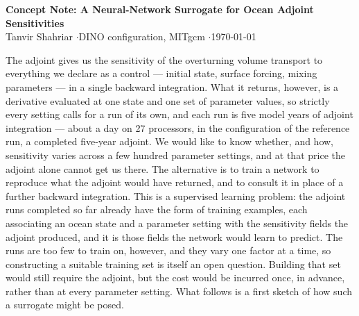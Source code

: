\begin{center}
{\large\bfseries Concept Note: A Neural-Network Surrogate for Ocean Adjoint Sensitivities}\\[2pt]
{\small Tanvir Shahriar \quad$\cdot$\quad DINO configuration, MITgcm
 \quad$\cdot$\quad \today}
\end{center}

The adjoint gives us the sensitivity of the overturning volume transport to everything we
declare as a control --- initial state, surface forcing, mixing parameters --- in a single
backward integration. What it returns, however, is a derivative evaluated at one state and
one set of parameter values, so strictly every setting calls for a run of its own, and each
run is five model years of adjoint integration --- about a day on 27 processors, in the
configuration of the reference run, a completed five-year adjoint. We would like to know
whether, and how, sensitivity varies across a few hundred parameter settings, and at that
price the adjoint alone cannot get us there. The alternative is to train a network to
reproduce what the adjoint would have returned, and to consult it in place of a further
backward integration. This is a supervised learning problem: the adjoint runs completed so
far already have the form of training examples, each associating an ocean state and a
parameter setting with the sensitivity fields the adjoint produced, and it is those fields
the network would learn to predict. The runs are too few to train on, however, and they vary
one factor at a time, so constructing a suitable training set is itself an open question.
Building that set would still require the adjoint, but the cost would be incurred once, in
advance, rather than at every parameter setting. What follows is a first sketch of how such
a surrogate might be posed.

